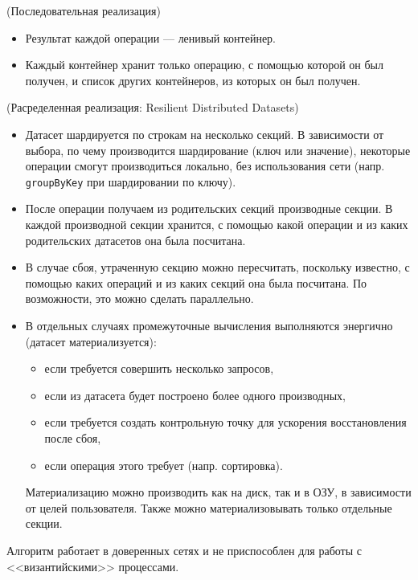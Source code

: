 \begin{algorithm}(Последовательная реализация)
  \begin{itemize}
    \item Результат каждой операции --- ленивый контейнер.
    \item Каждый контейнер хранит только операцию, с помощью которой он был
      получен, и список других контейнеров, из которых он был получен.
  \end{itemize}
\end{algorithm}

\begin{algorithm}(Расределенная реализация: Resilient Distributed Datasets)
  \begin{itemize}
    \item Датасет шардируется по строкам на несколько секций. В зависимости от
      выбора, по чему производится шардирование (ключ или значение), некоторые
      операции смогут производиться локально, без использования сети (напр.
      \newline \texttt{groupByKey} при шардировании по ключу).
    \item После операции получаем из родительских секций производные секции.
      В каждой производной секции хранится, с помощью какой операции и из каких
      родительских датасетов она была посчитана.
    \item В случае сбоя, утраченную секцию можно пересчитать, поскольку
      известно, с помощью каких операций и из каких секций она была посчитана.
      По возможности, это можно сделать параллельно.
    \item В отдельных случаях промежуточные вычисления выполняются энергично
      (датасет материализуется):
      \begin{itemize}
        \item если требуется совершить несколько запросов,
        \item если из датасета будет построено более одного производных,
        \item если требуется создать контрольную точку для ускорения
          восстановления после сбоя,
        \item если операция этого требует (напр. сортировка).
      \end{itemize}
      Материализацию можно производить как на диск, так и в ОЗУ, в зависимости
      от целей пользователя. Также можно материализовывать только отдельные
      секции.
  \end{itemize}
\end{algorithm}

\begin{remark} Алгоритм работает в доверенных сетях и не приспособлен для
  работы с <<византийскими>> процессами.
\end{remark}
